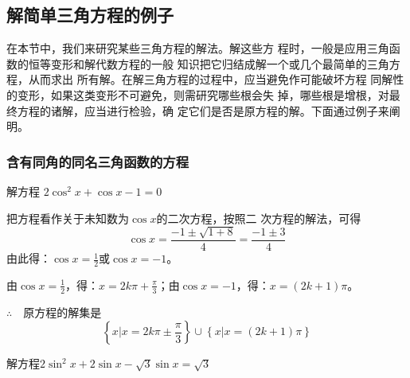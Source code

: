 \subsection{解简单三角方程的例子}
在本节中，我们来研究某些三角方程的解法。解这些方
程时，一般是应用三角函数的恒等变形和解代数方程的一般
知识把它归结成解一个或几个最简单的三角方程，从而求出
所有解。在解三角方程的过程中，应当避免作可能破坏方程
同解性的变形，如果这类变形不可避免，则需研究哪些根会失
掉，哪些根是增根，对最终方程的诸解，应当进行检验，确
定它们是否是原方程的解。下面通过例子来阐明。

\subsubsection{含有同角的同名三角函数的方程}
\begin{example}
    解方程
 $   2\cos^2x+\cos x-1=0$
\end{example}

\begin{solution}
    把方程看作关于未知数为$\cos x$的二次方程，按照二
次方程的解法，可得
\[\cos x=\frac{-1\pm\sqrt{1+8}}{4}=\frac{-1\pm 3}{4}\]
由此得：$\cos x=\frac{1}{2}$或$\cos x=-1$。

由$\cos x=\frac{1}{2}$，得：$x=2k\pi+\frac{\pi}{3}$；由$\cos x=-1$，得：$x=(2k+1)\pi$。

$\therefore\quad $原方程的解集是
\[\left\{x\big| x=2k\pi\pm \frac{\pi}{3}\right\}\cup \left\{x\big| x=(2k+1)\pi \right\}\]
\end{solution}

\begin{example}
    解方程$2\sin^2x+2\sin x-\sqrt{3}\sin x=\sqrt{3}$
\end{example}

